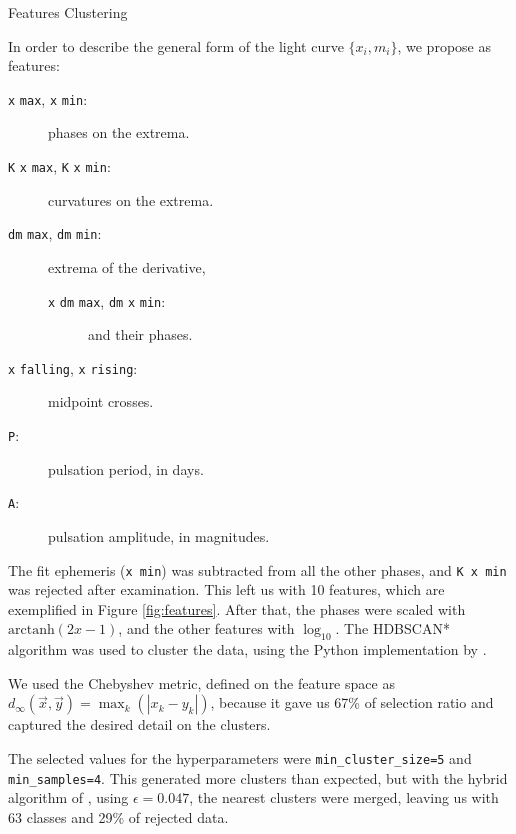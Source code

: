 \documentclass[
    a0paper,
    portrait,
]{baposter}
\begin{document}
\begin{poster}
\begin{posterbox}[name=features,column=1,span=2,row=0]{Features \hspace{5.9cm} Clustering}
\begin{multicols}{2}
    In order to describe the general form of the light curve $\{x_i,m_i\}$, we propose as features:
    \begin{description}
        \item[\texttt{x} \texttt{max}, \texttt{x} \texttt{min}:] phases on the extrema. 
        \item[\texttt{K} \texttt{x} \texttt{max}, \texttt{K} \texttt{x} \texttt{min}:] curvatures on the extrema.
        \item[\texttt{dm} \texttt{max}, \texttt{dm} \texttt{min}:] extrema of the derivative,
        \begin{description}
            \item[\texttt{x} \texttt{dm} \texttt{max}, \texttt{dm} \texttt{x} \texttt{min}:] and their phases.
        \end{description}
        \item[\texttt{x} \texttt{falling}, \texttt{x} \texttt{rising}:] midpoint crosses.
        \item[\texttt{P}:] pulsation period, in days.
        \item[\texttt{A}:] pulsation amplitude, in magnitudes.
    \end{description}
    The fit ephemeris (\alert{\texttt{x min}}) was subtracted from all the other phases, and \alert{\texttt{K x min}} was rejected after examination. This left us with 10 features, which are exemplified in Figure \ref{fig:features}. After that, the phases were scaled with $\text{arctanh}\left(2x-1\right)$, and the other features with $\log_{10}$. \vspace{-4mm}
\vfill\null
\columnbreak
    The HDBSCAN* algorithm \citep{Campello2013} was used to cluster the data, using the Python implementation by \cite{McInnes2017}. 

    We used the Chebyshev metric, defined on the feature space as $d_{\infty}(\vec{x},\vec{y})=\max_k(|x_k-y_k|)$, because it gave us 67\% of selection ratio and captured the desired detail on the clusters.

    The selected values for the hyperparameters were \texttt{min\_cluster\_size=5} and \texttt{min\_samples=4}.   This generated more clusters than expected, but with the hybrid algorithm of \cite{Malzer2020}, using $\epsilon=0.047$, the nearest clusters were merged, leaving us with 63 classes and 29\% of rejected data.
\end{multicols}
\end{posterbox}




\end{poster}
\end{document}
